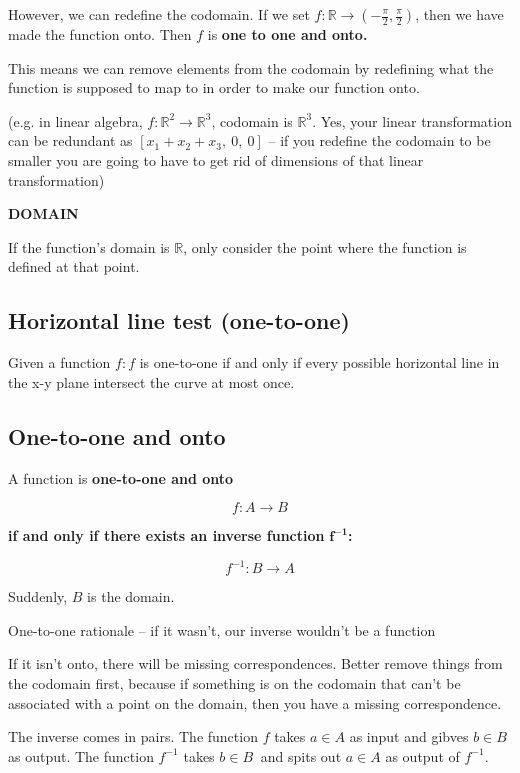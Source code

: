 \documentclass[12pt]{article}
\theoremstyle{plain}
\theoremstyle{remark}
\theoremstyle{definition}
\begin{document}
However, we can redefine the codomain. If we set
\(f\mathbb{:R \rightarrow}\left( - \frac{\pi}{2},\frac{\pi}{2} \right)\),
then we have made the function onto. Then \(f\) is \textbf{one to one
and onto.}

This means we can remove elements from the codomain by redefining what
the function is supposed to map to in order to make our function onto.

(e.g. in linear algebra,
\(f:\mathbb{R}^{2} \rightarrow \mathbb{R}^{3}\), codomain is
\(\mathbb{R}^{3}\). Yes, your linear transformation can be redundant as
\(\left\lbrack x_{1} + x_{2} + x_{3},\ 0,\ 0 \right\rbrack\) -- if you
redefine the codomain to be smaller you are going to have to get rid of
dimensions of that linear transformation)

\textbf{DOMAIN}

If the function's domain is \(\mathbb{R}\), only consider the point
where the function is defined at that point.


\subsection{Horizontal line test
(one-to-one)}

Given a function \(f:f\) is one-to-one if and only if every possible
horizontal line in the x-y plane intersect the curve at most once.


\subsection{One-to-one and onto}

A function is \textbf{one-to-one and onto}

\[f:A \rightarrow B\]

\textbf{if and only if there exists an inverse function}
\(\mathbf{f}^{\mathbf{- 1}}\)\textbf{:}

\[f^{- 1}:B \rightarrow A\]

Suddenly, \(B\) is the domain.

One-to-one rationale -- if it wasn't, our inverse wouldn't be a function

If it isn't onto, there will be missing correspondences. Better remove
things from the codomain first, because if something is on the codomain
that can't be associated with a point on the domain, then you have a
missing correspondence.

The inverse comes in pairs. The function \(f\) takes \(a \in A\) as
input and gibves \(b \in B\) as output. The function \(f^{- 1}\) takes
\(b \in B\ \) and spits out \(a \in A\) as output of \(f^{- 1}\).
\end{document}
